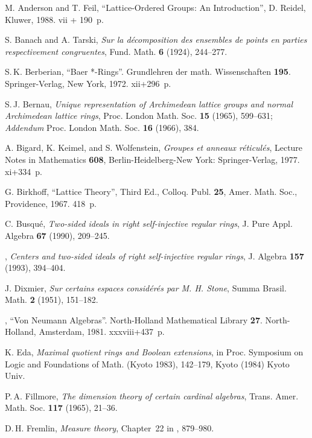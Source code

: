 \documentclass[psamsfonts,reqno]{memo-l}
\theoremstyle{plain}
\theoremstyle{definition}
\theoremstyle{remark}
\numberwithin{equation}{section}
\begin{document}
\begin{thebibliography}{99}

M. Anderson and T. Feil,
``Lattice-Ordered Groups: An Introduction'', D. Reidel, Kluwer, 1988. vii +
190~p.

S. Banach and A. Tarski,
\emph{Sur la d\'ecomposition des ensembles de points en parties
respectivement congruentes}, Fund. Math. \textbf{6} (1924), 244--277.

S.\,K. Berberian,
``Baer *-Rings''. Grundlehren der math. Wissenschaften \textbf{195}.
Springer-Verlag, New York, 1972. xii+296~p.

S.\,J. Bernau,
\emph{Unique representation of Archimedean lattice groups and normal
Archimedean lattice rings}, Proc. London Math. Soc. \textbf{15} (1965),
599--631; \emph{Addendum} Proc. London Math. Soc. \textbf{16} (1966), 384.

A. Bigard, K. Keimel, and S. Wolfenstein,
\emph{Groupes et anneaux r{\'e}ticul{\'e}s},
Lecture Notes in Mathematics \textbf{608}, Berlin-Heidelberg-New
York: Springer-Verlag, 1977. xi+334~p.

G. Birkhoff,
``Lattice Theory'',
Third Ed., Colloq. Publ. \textbf{25}, Amer. Math. Soc., Providence,
1967. 418~p.

C. Busqu{\'e},
\emph{Two-sided ideals in right self-injective regular rings},
J. Pure Appl. Algebra \textbf{67} (1990), 209--245.

\bysame,
\emph{Centers and two-sided ideals of right self-injective regular
rings}, J. Algebra {\bf 157} (1993), 394--404.

J. Dixmier,
\emph{Sur certains espaces consid\'er\'es par M. H. Stone}, Summa
Brasil. Math. {\bf 2} (1951), 151--182.

\bysame, ``Von Neumann Algebras''. North-Holland Mathematical Library
\textbf{27}. North-Holland, Amsterdam, 1981. xxxviii+437~p.

K. Eda,
\emph{Maximal quotient rings and Boolean extensions},
in Proc. Symposium on Logic and Foundations of Math. (Kyoto 1983), 142--179,
Kyoto (1984) Kyoto Univ.

P.\,A. Fillmore,
\emph{The dimension theory of certain cardinal algebras},
Trans. Amer.  Math. Soc. \textbf{117} (1965), 21--36.

D.\,H. Fremlin,
\emph{Measure theory}, Chapter~22 in \cite{HBA3}, 879--980.


\end{thebibliography}
\end{document}
